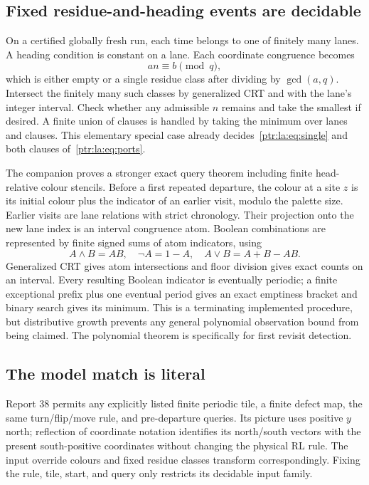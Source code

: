 \documentclass[11pt,letterpaper]{article}
\theoremstyle{definition}\newtheorem{definition}[theorem]{Definition}
\theoremstyle{remark}\newtheorem{remark}[theorem]{Remark}
\begin{document}
\subsection{Fixed residue-and-heading events are decidable}
On a certified globally fresh run, each time belongs to one of finitely many lanes. A heading condition is constant on a lane. Each coordinate congruence becomes
\[
 an\equiv b\pmod q,
\]
which is either empty or a single residue class after dividing by $\gcd(a,q)$. Intersect the finitely many such classes by generalized CRT and with the lane's integer interval. Check whether any admissible $n$ remains and take the smallest if desired. A finite union of clauses is handled by taking the minimum over lanes and clauses. This elementary special case already decides~\eqref{ptr:la:eq:single} and both clauses of~\eqref{ptr:la:eq:ports}.

The companion proves a stronger exact query theorem including finite head-relative colour stencils. Before a first repeated departure, the colour at a site $z$ is its initial colour plus the indicator of an earlier visit, modulo the palette size. Earlier visits are lane relations with strict chronology. Their projection onto the new lane index is an interval congruence atom. Boolean combinations are represented by finite signed sums of atom indicators, using
\[
 A\wedge B=AB,\quad \neg A=1-A,\quad A\vee B=A+B-AB.
\]
Generalized CRT gives atom intersections and floor division gives exact counts on an interval. Every resulting Boolean indicator is eventually periodic; a finite exceptional prefix plus one eventual period gives an exact emptiness bracket and binary search gives its minimum. This is a terminating implemented procedure, but distributive growth prevents any general polynomial observation bound from being claimed. The polynomial theorem is specifically for first revisit detection.

\subsection{The model match is literal}
Report 38 permits any explicitly listed finite periodic tile, a finite defect map, the same turn/flip/move rule, and pre-departure queries. Its picture uses positive $y$ north; reflection of coordinate notation identifies its north/south vectors with the present south-positive coordinates without changing the physical RL rule. The input override colours and fixed residue classes transform correspondingly. Fixing the rule, tile, start, and query only restricts its decidable input family.
\end{document}
